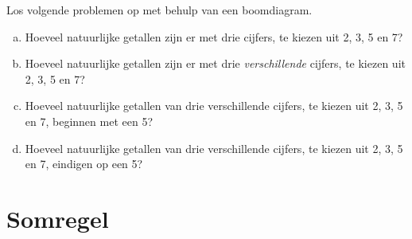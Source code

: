 \documentclass[12pt,twoside]{article}
\begin{document}
\vspace*{-1cm}
\begin{oefening}
Los volgende problemen op met behulp van een boomdiagram.
\begin{enumerate}[(a)]
  \item Hoeveel natuurlijke getallen zijn er met drie cijfers, te kiezen uit 2, 3, 5 en 7?
  \item Hoeveel natuurlijke getallen zijn er met drie {\em verschillende} cijfers, te kiezen uit 2, 3, 5 en 7?
  \item Hoeveel natuurlijke getallen van drie verschillende cijfers, te kiezen uit 2, 3, 5 en 7, beginnen met een 5?
  \item Hoeveel natuurlijke getallen van drie verschillende cijfers, te kiezen uit 2, 3, 5 en 7, eindigen op een 5?
\end{enumerate}
\end{oefening}

\pagebreak
\section{Somregel}
\end{document}
